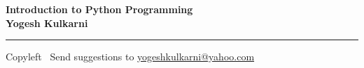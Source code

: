 
\graphicspath{{images/}}

\footnotesize


\begin{center}
\Large{\textbf{Introduction to Python Programming\\ Yogesh Kulkarni}}  
\end{center}

\begin{multicols}{2}
	
\end{multicols}

\rule{\linewidth}{0.25pt}
\scriptsize
Copyleft \textcopyleft\  Send suggestions to 
\href{http://www.yogeshkulkarni.com}{yogeshkulkarni@yahoo.com}


